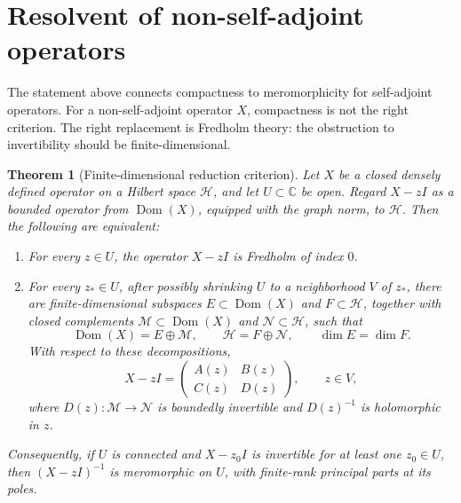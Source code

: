 \documentclass[JHEP,12pt]{article}
\newtheorem{theorem}[lemma]{Theorem}
\begin{document}
\section{Resolvent of non-self-adjoint operators}

The statement above connects compactness to meromorphicity for self-adjoint
operators. For a non-self-adjoint operator \(X\), compactness is not the right
criterion. The right replacement is Fredholm theory: the obstruction to
invertibility should be finite-dimensional.

\begin{theorem}[Finite-dimensional reduction criterion]
Let \(X\) be a closed densely defined operator on a Hilbert space
\(\mathcal H\), and let \(U\subset\mathbb C\) be open. Regard
\(X-zI\) as a bounded operator from \(\operatorname{Dom}(X)\), equipped with
the graph norm, to \(\mathcal H\). Then the following are equivalent:

\begin{enumerate}
\item For every \(z\in U\), the operator \(X-zI\) is Fredholm of index \(0\).

\item For every \(z_\ast\in U\), after possibly shrinking \(U\) to a
neighborhood \(V\) of \(z_\ast\), there are finite-dimensional subspaces
\(E\subset\operatorname{Dom}(X)\) and \(F\subset\mathcal H\), together with
closed complements \(\mathcal M\subset\operatorname{Dom}(X)\) and
\(\mathcal N\subset\mathcal H\), such that
\[
\operatorname{Dom}(X)=E\oplus\mathcal M,
\qquad
\mathcal H=F\oplus\mathcal N,
\qquad
\dim E=\dim F .
\]
With respect to these decompositions,
\[
X-zI=
\begin{pmatrix}
A(z)&B(z)\\
C(z)&D(z)
\end{pmatrix},
\qquad z\in V,
\]
where \(D(z):\mathcal M\to\mathcal N\) is boundedly invertible and
\(D(z)^{-1}\) is holomorphic in \(z\).
\end{enumerate}

Consequently, if \(U\) is connected and \(X-z_0I\) is invertible for at least
one \(z_0\in U\), then \((X-zI)^{-1}\) is meromorphic on \(U\), with
finite-rank principal parts at its poles.
\end{theorem}
\end{document}

